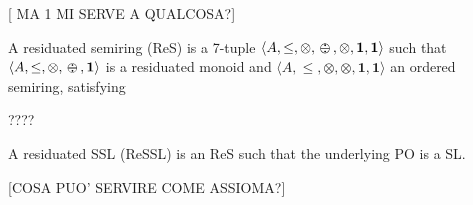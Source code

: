 \documentclass{llncs}
\def\monid{{\mathbf 0}}
\def\1{{\mathbf 1}}
\def\monop{\otimes}
\def\odiv{\, {\ominus\hspace{-7.7pt} \div} \,}
\def\monid{\mathbf{1}}
\begin{document}
{[ MA 1 MI SERVE A QUALCOSA?]

\begin{definition}[residuation, II]
	A residuated semiring (ReS) is a 7-tuple $\langle A, \leq, \monop, \odiv, \monop, \monid, \1 \rangle$
	such that	$\langle A, \leq, \monop, \odiv, \monid \rangle$
	 is a residuated monoid and $\langle A, \leq, \monop, \monop, \monid, \1 \rangle$ an ordered semiring,
	  satisfying 
	\begin{itemize}
            ????
	\end{itemize}
	A residuated SSL (ReSSL) is an ReS such that the underlying PO is a SL.
\end{definition}

[COSA PUO' SERVIRE COME ASSIOMA?]

%
}
\end{document}
